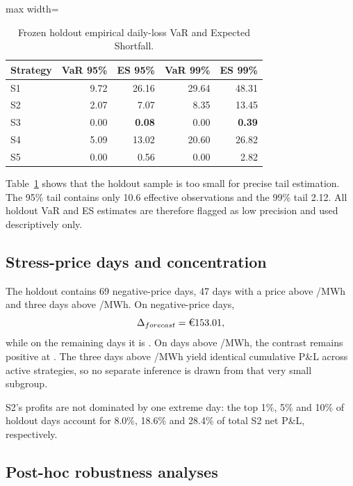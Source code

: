 \begin{table}[htbp]
\centering
\caption{Frozen holdout empirical daily-loss VaR and Expected Shortfall.}
\label{tab:holdout_tailrisk}
\begin{adjustbox}{max width=\textwidth}
\begin{tabular}{lrrrr}
\toprule
Strategy & VaR 95\% & ES 95\% & VaR 99\% & ES 99\% \\
\midrule
S1 & 9.72 & 26.16 & 29.64 & 48.31 \\
S2 & 2.07 & 7.07 & 8.35 & 13.45 \\
S3 & 0.00 & \textbf{0.08} & 0.00 & \textbf{0.39} \\
S4 & 5.09 & 13.02 & 20.60 & 26.82 \\
S5 & 0.00 & 0.56 & 0.00 & 2.82 \\
\bottomrule
\end{tabular}
\end{adjustbox}
\end{table}

Table~\ref{tab:holdout_tailrisk} shows that the holdout sample is too small for precise tail estimation. The 95\% tail contains only 10.6 effective observations and the 99\% tail 2.12. All holdout VaR and ES estimates are therefore flagged as low precision and used descriptively only.

\subsection{Stress-price days and concentration}

The holdout contains 69 negative-price days, 47 days with a price above /MWh and three days above /MWh. On negative-price days,
\[
\Delta_{forecast}=\EUR{153.01},
\]
while on the remaining days it is . On days above /MWh, the contrast remains positive at . The three days above /MWh yield identical cumulative P\&L across active strategies, so no separate inference is drawn from that very small subgroup.

S2's profits are not dominated by one extreme day: the top 1\%, 5\% and 10\% of holdout days account for 8.0\%, 18.6\% and 28.4\% of total S2 net P\&L, respectively.

\subsection{Post-hoc robustness analyses}
\label{sec:posthoc_results}

